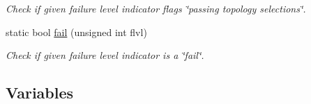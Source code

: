 \begin{DoxyCompactItemize}
\begin{DoxyCompactList}\small\item\em Check if given failure level indicator flags \char`\"{}passing topology selections\char`\"{}. \end{DoxyCompactList}\item 
static bool \hyperlink{namespaceAnalysis_1_1Select_1_1Event_a47502e772035183d09ef7699edc27ce2}{fail} (unsigned int flvl)
\begin{DoxyCompactList}\small\item\em Check if given failure level indicator is a \char`\"{}fail\char`\"{}. \end{DoxyCompactList}\end{DoxyCompactItemize}
\subsection*{Variables}
